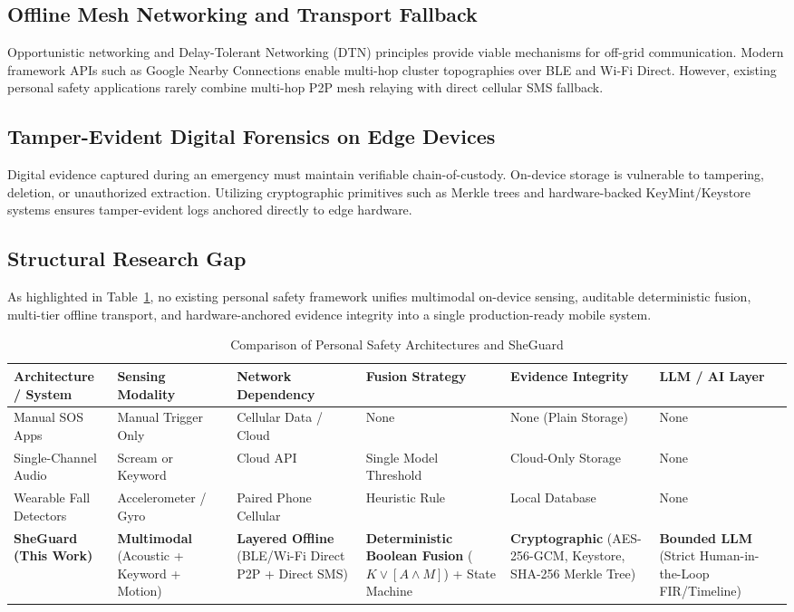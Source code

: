\documentclass[conference]{IEEEtran}
\begin{document}
\subsection{Offline Mesh Networking and Transport Fallback}
Opportunistic networking and Delay-Tolerant Networking (DTN) principles \cite{fall2003, conti2014} provide viable mechanisms for off-grid communication. Modern framework APIs such as Google Nearby Connections \cite{google_nearby} enable multi-hop cluster topographies over BLE and Wi-Fi Direct. However, existing personal safety applications rarely combine multi-hop P2P mesh relaying with direct cellular SMS fallback.

\subsection{Tamper-Evident Digital Forensics on Edge Devices}
Digital evidence captured during an emergency must maintain verifiable chain-of-custody. On-device storage is vulnerable to tampering, deletion, or unauthorized extraction. Utilizing cryptographic primitives such as Merkle trees \cite{merkle1987} and hardware-backed KeyMint/Keystore systems \cite{android_keystore} ensures tamper-evident logs anchored directly to edge hardware.

\subsection{Structural Research Gap}
As highlighted in Table~\ref{tab:comp}, no existing personal safety framework unifies multimodal on-device sensing, auditable deterministic fusion, multi-tier offline transport, and hardware-anchored evidence integrity into a single production-ready mobile system.

\begin{table}[htbp]
\caption{Comparison of Personal Safety Architectures and SheGuard}
\label{tab:comp}
\centering
\begin{tabular}{p{2.2cm}p{2.8cm}p{2.8cm}p{2.8cm}p{2.8cm}p{2.5cm}}
\toprule
\textbf{Architecture / System} & \textbf{Sensing Modality} & \textbf{Network Dependency} & \textbf{Fusion Strategy} & \textbf{Evidence Integrity} & \textbf{LLM / AI Layer} \\
\midrule
Manual SOS Apps & Manual Trigger Only & Cellular Data / Cloud & None & None (Plain Storage) & None \\
Single-Channel Audio & Scream or Keyword & Cloud API & Single Model Threshold & Cloud-Only Storage & None \\
Wearable Fall Detectors & Accelerometer / Gyro & Paired Phone Cellular & Heuristic Rule & Local Database & None \\
\textbf{SheGuard (This Work)} & \textbf{Multimodal} (Acoustic + Keyword + Motion) & \textbf{Layered Offline} (BLE/Wi-Fi Direct P2P + Direct SMS) & \textbf{Deterministic Boolean Fusion} ($K \lor [A \land M]$) + State Machine & \textbf{Cryptographic} (AES-256-GCM, Keystore, SHA-256 Merkle Tree) & \textbf{Bounded LLM} (Strict Human-in-the-Loop FIR/Timeline) \\
\bottomrule
\end{tabular}
\end{table}
\end{document}
